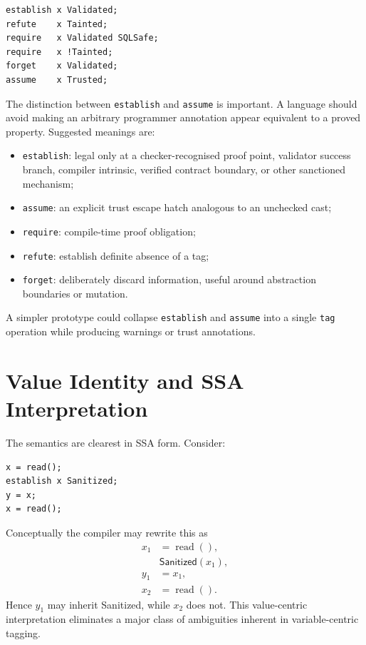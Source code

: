\documentclass[11pt]{article}
\begin{document}
\begin{lstlisting}
establish x Validated;
refute    x Tainted;
require   x Validated SQLSafe;
require   x !Tainted;
forget    x Validated;
assume    x Trusted;
\end{lstlisting}

The distinction between \texttt{establish} and \texttt{assume} is important. A language should avoid making an arbitrary programmer annotation appear equivalent to a proved property. Suggested meanings are:

\begin{itemize}
  \item \texttt{establish}: legal only at a checker-recognised proof point, validator success branch, compiler intrinsic, verified contract boundary, or other sanctioned mechanism;
  \item \texttt{assume}: an explicit trust escape hatch analogous to an unchecked cast;
  \item \texttt{require}: compile-time proof obligation;
  \item \texttt{refute}: establish definite absence of a tag;
  \item \texttt{forget}: deliberately discard information, useful around abstraction boundaries or mutation.
\end{itemize}

A simpler prototype could collapse \texttt{establish} and \texttt{assume} into a single \texttt{tag} operation while producing warnings or trust annotations.

\section{Value Identity and SSA Interpretation}
The semantics are clearest in SSA form. Consider:

\begin{lstlisting}
x = read();
establish x Sanitized;
y = x;
x = read();
\end{lstlisting}

Conceptually the compiler may rewrite this as
\begin{align*}
x_1 &= \operatorname{read}(),\\
&\textsf{Sanitized}(x_1),\\
y_1 &= x_1,\\
x_2 &= \operatorname{read}().
\end{align*}
Hence $y_1$ may inherit \textsf{Sanitized}, while $x_2$ does not. This value-centric interpretation eliminates a major class of ambiguities inherent in variable-centric tagging.
\end{document}
